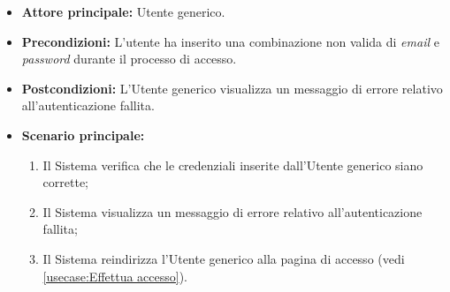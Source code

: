 \label{usecase:Accesso fallito}

\begin{itemize}
	\item \textbf{Attore principale:} Utente generico.
	\item \textbf{Precondizioni:}
    L'utente ha inserito una combinazione non valida di \textit{email} e \textit{password} durante il processo di accesso.
	\item \textbf{Postcondizioni:} L'Utente generico visualizza un messaggio di errore relativo all'autenticazione fallita.

	\item \textbf{Scenario principale:}
	\begin{enumerate}
        \item Il Sistema verifica che le credenziali inserite dall'Utente generico siano corrette;
        \item Il Sistema visualizza un messaggio di errore relativo all'autenticazione fallita;
        \item Il Sistema reindirizza l'Utente generico alla pagina di accesso (vedi \autoref{usecase:Effettua accesso}).
    \end{enumerate}
	
\end{itemize}